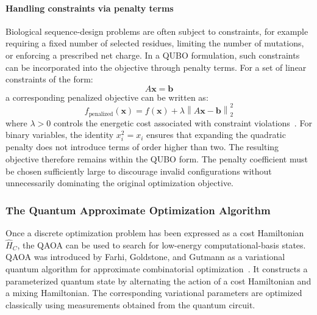 \paragraph{Handling constraints via penalty terms}
Biological sequence-design problems are often subject to constraints, for example requiring a fixed number of selected residues, limiting the number of mutations, or enforcing a prescribed net charge. In a QUBO formulation, such constraints can be incorporated into the objective through penalty terms. For a set of linear constraints of the form:
\begin{equation}
A\mathbf{x}=\mathbf{b}
\end{equation}
a corresponding penalized objective can be written as:
\begin{equation}
f_{\mathrm{penalized}}(\mathbf{x}) = f(\mathbf{x})
+
\lambda
\left\|
A\mathbf{x}-\mathbf{b}
\right\|_2^2
\end{equation}
where $\lambda>0$ controls the energetic cost associated with constraint violations~\cite{qubo_2}. For binary variables, the identity $x_i^2=x_i$ ensures that expanding the quadratic penalty does not introduce terms of order higher than two. The resulting objective therefore remains within the QUBO form. The penalty coefficient must be chosen sufficiently large to discourage invalid configurations without unnecessarily dominating the original optimization objective.




\subsubsection{The Quantum Approximate Optimization Algorithm}
Once a discrete optimization problem has been expressed as a cost Hamiltonian $\hat{H}_C$, the QAOA can be used to search for low-energy computational-basis states. QAOA was introduced by Farhi, Goldstone, and Gutmann as a variational quantum algorithm for approximate combinatorial optimization~\cite{QAOA}. It constructs a parameterized quantum state by alternating the action of a cost Hamiltonian and a mixing Hamiltonian. The corresponding variational parameters are optimized classically using measurements obtained from the quantum circuit.

